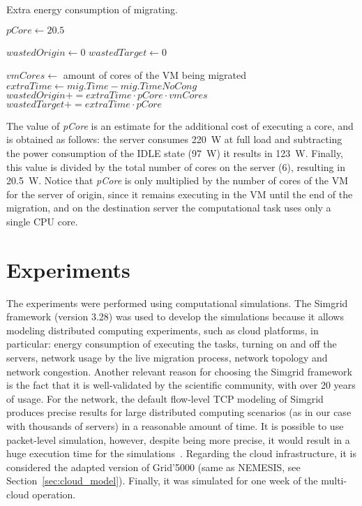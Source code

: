 \begin{algorithm}
\begin{algorithmic}
\caption{Extra energy consumption of migrating.}\label{alg:wasted_energy}

\State $pCore \gets 20.5$

\State $wastedOrigin \gets 0$
\State $wastedTarget \gets 0$

    \State $vmCores \gets$ amount of cores of the VM being migrated
    \State $extraTime \gets mig.Time - mig.TimeNoCong$
        \State $wastedOrigin += extraTime \cdot pCore \cdot vmCores$ 
        \State $wastedTarget += extraTime \cdot pCore$ 
    \EndIf
\EndFor
\end{algorithmic}
\end{algorithm}

The value of \textit{pCore} is an estimate for the additional cost of executing a core, and is obtained as follows: the server consumes \SI{220}{\watt} at full load and subtracting the power consumption of the IDLE state (\SI{97}{\watt}) it results in \SI{123}{\watt}. Finally, this value is divided by the total number of cores on the server (6), resulting in \SI{20.5}{\watt}. Notice that \textit{pCore} is only multiplied by the number of cores of the VM for the server of origin, since it remains executing in the VM until the end of the migration, and on the destination server the computational task uses only a single CPU core.

\section{Experiments}
\label{sec:simulations_smargreens}

The experiments were performed using computational simulations. The Simgrid~\cite{CASANOVA20142899} framework (version 3.28) was used to develop the simulations because it allows modeling distributed computing experiments, such as cloud platforms, in particular: energy consumption of executing the tasks, turning on and off the servers, network usage by the live migration process, network topology and network congestion. Another relevant reason for choosing the Simgrid framework is the fact that it is well-validated by the scientific community, with over 20 years of usage. For the network, the default flow-level TCP modeling of Simgrid produces precise results for large distributed computing scenarios (as in our case with thousands of servers) in a reasonable amount of time. It is possible to use packet-level simulation, however, despite being more precise, it would result in a huge execution time for the simulations~\cite{velho2013simgridparameters}. Regarding the cloud infrastructure, it is considered the adapted version of Grid'5000 (same as NEMESIS, see Section~\ref{sec:cloud_model}). Finally, it was simulated for one week of the multi-cloud operation.
